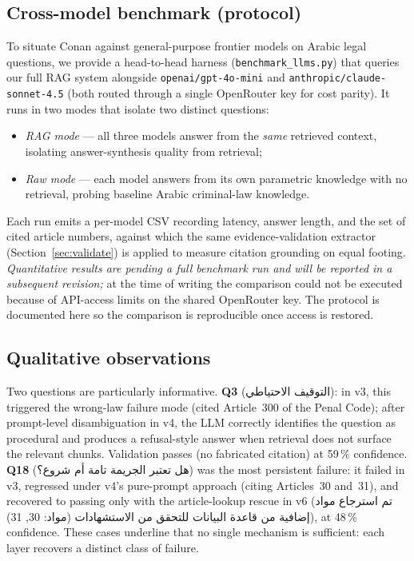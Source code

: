 \documentclass[final,1p,times]{elsarticle}
\newcommand{\ar}[1]{{\arabicfont\beginR #1\endR}}
\begin{document}
\subsection{Cross-model benchmark (protocol)}\label{sec:crossmodel}

To situate Conan against general-purpose frontier models on Arabic legal
questions, we provide a head-to-head harness (\texttt{benchmark\_llms.py})
that queries our full RAG system alongside \texttt{openai/gpt-4o-mini} and
\texttt{anthropic/claude-sonnet-4.5} (both routed through a single OpenRouter
key for cost parity). It runs in two modes that isolate two distinct
questions:
\begin{itemize}
  \item \emph{RAG mode} --- all three models answer from the \emph{same}
        retrieved context, isolating answer-synthesis quality from retrieval;
  \item \emph{Raw mode} --- each model answers from its own parametric
        knowledge with no retrieval, probing baseline Arabic
        criminal-law knowledge.
\end{itemize}
Each run emits a per-model CSV recording latency, answer length, and the set
of cited article numbers, against which the same evidence-validation extractor
(Section~\ref{sec:validate}) is applied to measure citation grounding on equal
footing. \emph{Quantitative results are pending a full benchmark run and will
be reported in a subsequent revision;} at the time of writing the comparison
could not be executed because of API-access limits on the shared OpenRouter
key. The protocol is documented here so the comparison is reproducible once
access is restored.

\subsection{Qualitative observations}

Two questions are particularly informative. \textbf{Q3}
(\ar{التوقيف الاحتياطي}): in v3, this triggered the wrong-law failure mode
(cited Article~300 of the Penal Code); after prompt-level disambiguation in
v4, the LLM correctly identifies the question as procedural and produces a
refusal-style answer when retrieval does not surface the relevant chunks.
Validation passes (no fabricated citation) at 59\,\% confidence.
\textbf{Q18} (\ar{هل تعتبر الجريمة تامة أم شروع؟}) was the most persistent
failure: it failed in v3, regressed under v4's pure-prompt approach (citing
Articles~30 and~31), and recovered to passing only with the article-lookup
rescue in v6 (\ar{تم استرجاع مواد إضافية من قاعدة البيانات للتحقق من
الاستشهادات (مواد: 30, 31)}), at 48\,\% confidence. These cases underline
that no single mechanism is sufficient: each layer recovers a distinct
class of failure.
\end{document}
